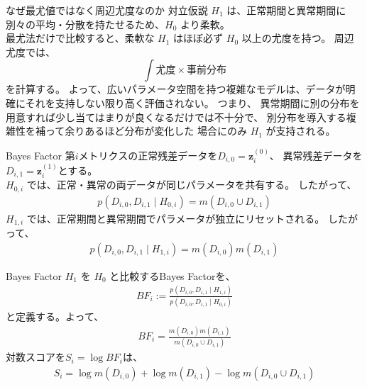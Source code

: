 \documentclass[dvipdfmx, 11pt, aspectratio=169, notheorems]{beamer}
\begin{document}
\begin{frame}{なぜ最尤値ではなく周辺尤度なのか}
    対立仮説 \(H_1\) は、正常期間と異常期間に別々の平均・分散を持たせるため、\(H_0\) より柔軟。\\
    最尤法だけで比較すると、柔軟な \(H_1\) はほぼ必ず \(H_0\) 以上の尤度を持つ。
    周辺尤度では、
    \[
    \int
    \text{尤度}
    \times
    \text{事前分布}
    \]を計算する。
    よって、広いパラメータ空間を持つ複雑なモデルは、データが明確にそれを支持しない限り高く評価されない。
    つまり、
    異常期間に別の分布を用意すれば少し当てはまりが良くなるだけでは不十分で、
    別分布を導入する複雑性を補って余りあるほど分布が変化した
    場合にのみ \(H_1\) が支持される。
\end{frame}

\begin{frame}{Bayes Factor}
    第$i$メトリクスの正常残差データを$D_{i,0} = \boldsymbol z_i^{(0)}$、
    異常残差データを$ D_{i,1} = \boldsymbol z_i^{(1)}$とする。\\
    \(H_{0,i}\) では、正常・異常の両データが同じパラメータを共有する。
    したがって、
    \begin{align}
    p(D_{i,0},D_{i,1}\mid H_{0,i}) = m(D_{i,0}\cup D_{i,1})
    \end{align}
    \(H_{1,i}\) では、正常期間と異常期間でパラメータが独立にリセットされる。
    したがって、
    \begin{align}
    p(D_{i,0},D_{i,1}\mid H_{1,i}) = m(D_{i,0})m(D_{i,1})
    \end{align}
\end{frame}

\begin{frame}{Bayes Factor}
    \(H_1\) を \(H_0\) と比較するBayes Factorを、
    \begin{align}
    BF_i := \frac{p(D_{i,0},D_{i,1}\mid H_{1,i})}{p(D_{i,0},D_{i,1}\mid H_{0,i})}
    \end{align}と定義する。よって、
    \begin{align}
        BF_i = \frac{m(D_{i,0})m(D_{i,1})}{m(D_{i,0}\cup D_{i,1})}
    \end{align}
    対数スコアを$ S_i = \log BF_i$は、
    \begin{align}
        S_i = \log m(D_{i,0}) + \log m(D_{i,1}) - \log m(D_{i,0}\cup D_{i,1})
    \end{align}
\end{frame}
\end{document}

